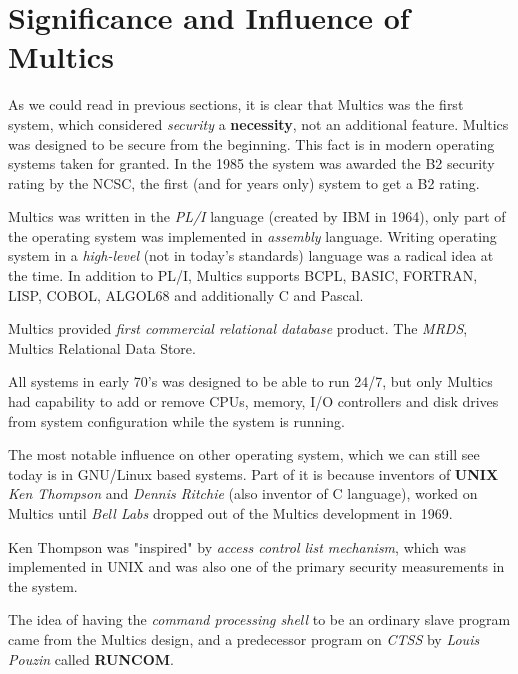 
\section{Significance and Influence of Multics}

As we could read in previous sections, it is clear that Multics was the first system, which considered \textit{security} a 
\textbf{necessity}, not an additional feature. Multics was designed to be secure from the beginning. This fact is in modern 
operating systems taken for granted. In the 1985 the system was awarded the B2 security rating by the NCSC, the first 
(and for years only) system to get a B2 rating.

Multics was written in the \textit{PL/I} language (created by IBM in 1964), only part of the operating system was implemented 
in \textit{assembly} language. Writing operating system in a \textit{high-level} (not in today's standards) language was a 
radical idea at the time. In addition to PL/I, Multics supports BCPL, BASIC, FORTRAN, LISP, COBOL, ALGOL68 and additionally C and Pascal. 

Multics provided \textit{first commercial relational database} product. The \textit{MRDS}, Multics Relational Data Store.\cite{mindpride}

All systems in early 70's was designed to be able to run 24/7, but only Multics had capability to add or remove CPUs, memory, 
I/O controllers and disk drives from system configuration while the system is running.

The most notable influence on other operating system, which we can still see today is in GNU/Linux based systems.
Part of it is because inventors of \textbf{UNIX} \textit{Ken Thompson} and \textit{Dennis Ritchie} (also inventor of C language), 
worked on Multics until \textit{Bell Labs} dropped out of the Multics development in 1969.

Ken Thompson was "inspired" by \textit{access control list mechanism}, which was implemented in UNIX and was also one of the
primary security measurements in the system.

The idea of having the \textit{command processing shell} to be an ordinary slave program came from the Multics design, 
and a predecessor program on \textit{CTSS} by \textit{Louis Pouzin} called \textbf{RUNCOM}.\cite{multicians}

